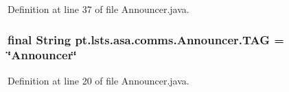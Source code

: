 Definition at line 37 of file Announcer.\+java.

\hypertarget{classpt_1_1lsts_1_1asa_1_1comms_1_1Announcer_a126257643f3cf4a5ecfe2d7982c6450a}{}
\subsubsection[{T\+A\+G}]{\setlength{\rightskip}{0pt plus 5cm}final String pt.\+lsts.\+asa.\+comms.\+Announcer.\+T\+A\+G = \char`\"{}Announcer\char`\"{}\hspace{0.3cm}{\ttfamily [static]}}\label{classpt_1_1lsts_1_1asa_1_1comms_1_1Announcer_a126257643f3cf4a5ecfe2d7982c6450a}


Definition at line 20 of file Announcer.\+java.

\hypertarget{classpt_1_1lsts_1_1asa_1_1comms_1_1Announcer_a95133bcfa573e3178268dc3b05cbe131}{}
